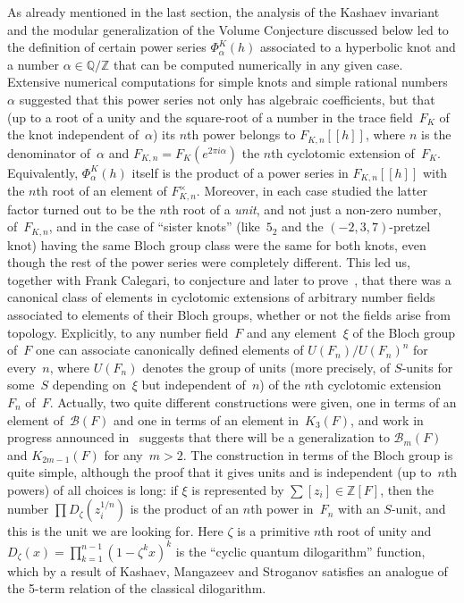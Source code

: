 \documentclass[12pt,reqno]{amsart}
\theoremstyle{definition}
\def\B{\mathcal B}  \def\hB{\widehat\B}
\def\a{\alpha}
\def\z{\zeta}
\def\Z{\mathbb Z}
\def\Q{\mathbb Q}
\begin{document}
\smallskip\noindent
As already mentioned in the last section, the analysis of the Kashaev invariant
and the modular generalization of the Volume Conjecture discussed below led to the
definition of
certain power series $\Phi_\a^K(h)$ associated to a hyperbolic knot and a number $\a\in\Q/\Z$
that can be computed numerically in any given case.  Extensive numerical computations
for simple knots and simple rational numbers~$\a$ suggested that this power series not
only has algebraic coefficients, but that (up to a root of a unity and the square-root
of a number in the trace field~$F_K$ of the knot independent of~$\a$) its $n$th power
belongs to $F_{K,n}[[h]]$, where $n$ is the denominator of~$\a$ and $F_{K,n}=F_K(e^{2\pi i\a})$
the $n$th cyclotomic extension of~$F_K$.  Equivalently, $\Phi_\a^K(h)$ itself is the product
of a power series in $F_{K,n}[[h]]$ with the $n$th root of an element of $F_{K,n}^\times$.
Moreover, in each case studied the latter factor turned out to be the $n$th root of a
{\it unit}, and not just a non-zero number, of~$F_{K,n}$, and in the case of ``sister knots''
(like~$5_2$ and the $(-2,3,7)$-pretzel knot) having the same Bloch group class were the
same for both knots, even though the rest of the power series were completely different.
This led us, together with Frank Calegari, to conjecture and later to prove~\cite{CGZ},
that there was a canonical class of elements in cyclotomic extensions of arbitrary number
fields associated to elements of their Bloch groups, whether or not the fields arise
from topology.  Explicitly, to any number field~$F$ and any element~$\xi$ of the Bloch
group of~$F$ one can associate canonically defined elements of $U(F_n)/U(F_n)^n$ for
every~$n$, where $U(F_n)$ denotes the group of units (more precisely, of $S$-units
for some~$S$ depending on~$\xi$ but independent of~$n$) of the $n$th cyclotomic
extension~$F_n$ of~$F$.  Actually, two quite different constructions were given, one in
terms of an element of~$\B(F)$ and one in terms of an element in~$K_3(F)$, and work in
progress announced in~\cite{CGZ} suggests that there will be a generalization to
$\B_m(F)$ and $K_{2m-1}(F)$ for any~$m>2$.  The construction in terms of the Bloch group
is quite simple, although the proof that it gives units and is independent (up
to~$n$th powers) of all choices is long: if $\xi$ is represented by $\sum[z_i]\in\Z[F]$,
then the number $\prod D_{\z}(z_i^{1/n})$ is the product of an $n$th power in~$F_n$ with
an $S$-unit, and this is the unit we are looking for. Here $\z$ is a primitive $n$th root
of unity and $D_{\z}(x)=\prod_{k=1}^{n-1}(1-\z^kx)^k$ is the ``cyclic quantum dilogarithm''
function, which by a result of Kashaev, Mangazeev and Stroganov satisfies an analogue of
the 5-term relation of the classical dilogarithm.
\end{document}
